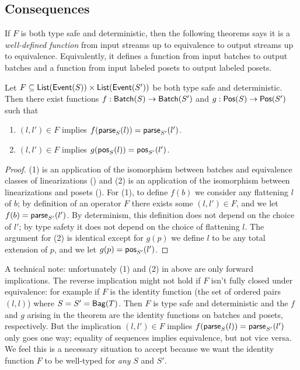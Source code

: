\subsection{Consequences}

If $F$ is both type safe and deterministic, then the following theorems says it is a \emph{well-defined function} from input streams up to equivalence to output streams up to equivalence.
Equivalently, it defines a function from input batches to output batches
and a function from input labeled posets to output labeled posets.

\begin{theorem}
\label{thm:type-safe-and-deterministic-consequence}
Let $F \subseteq \listtype{\event{S}} \times \listtype{\event{S'}}$ be both type safe and deterministic.
Then there exist functions $f: \batch{S} \to \batch{S'}$ and $g: \poset{S} \to \poset{S'}$
such that
\begin{enumerate}
\item[(1)] $(l, l') \in F$ implies $f(\parselin{l}{S}) = \parselin{l'}{S'}$.
\item[(2)] $(l, l') \in F$ implies $g(\posetlin{l}{S}) = \posetlin{l'}{S'}$.
\end{enumerate}
\end{theorem}
\begin{proof}
(1) is an application of the isomorphism between batches and equivalence classes of linearizations () and (2) is an application of the isomorphism between linearizations and posets ().
For (1), to define $f(b)$ we consider any flattening $l$ of $b$; by definition of an operator $F$ there exists some $(l, l') \in F$, and we let $f(b) = \parselin{l'}{S'}$. By determinism, this definition does not depend on the choice of $l'$; by type safety it does not depend on the choice of flattening $l$.
The argument for (2) is identical except for $g(p)$ we define $l$ to be any total extension of $p$, and we let $g(p) = \posetlin{l'}{S'}$.
\end{proof}

A technical note: unfortunately (1) and (2) in  above are only forward implications.
The reverse implication might not hold if $F$ isn't fully closed under equivalence: for example if $F$ is the identity function (the set of ordered pairs $(l, l)$) where $S = S' = \relleaf{T}$. Then $F$ is type safe and deterministic and the $f$ and $g$ arising in the theorem are the identity functions on batches and posets, respectively. But the implication $(l, l') \in F$ implies $f(\parselin{l}{S}) = \parselin{l'}{S'}$ only goes one way; equality of sequences implies equivalence, but not vice versa.
We feel this is a necessary situation to accept because we want the identity function $F$ to be well-typed for \emph{any} $S$ and $S'$.

